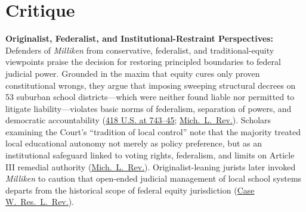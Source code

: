 \documentclass[12pt]{article}
\begin{document}
\section{Critique}
\textbf{Originalist, Federalist, and Institutional-Restraint Perspectives:} Defenders of \textit{Milliken} from conservative, federalist, and traditional-equity viewpoints praise the decision for restoring principled boundaries to federal judicial power. Grounded in the maxim that equity cures only proven constitutional wrongs, they argue that imposing sweeping structural decrees on 53 suburban school districts---which were neither found liable nor permitted to litigate liability---violates basic norms of federalism, separation of powers, and democratic accountability (\href{https://supreme.justia.com/cases/federal/us/418/717/}{418 U.S. at 743--45}; \href{https://repository.law.umich.edu/mlr/vol122/iss1/4/}{Mich.\ L.\ Rev.}). Scholars examining the Court's ``tradition of local control'' note that the majority treated local educational autonomy not merely as policy preference, but as an institutional safeguard linked to voting rights, federalism, and limits on Article III remedial authority (\href{https://repository.law.umich.edu/mlr/vol122/iss1/4/}{Mich.\ L.\ Rev.}). Originalist-leaning jurists later invoked \textit{Milliken} to caution that open-ended judicial management of local school systems departs from the historical scope of federal equity jurisdiction (\href{https://scholarlycommons.law.case.edu/cgi/viewcontent.cgi?article=2101&context=caselrev}{Case W.\ Res.\ L.\ Rev.}).
\end{document}
